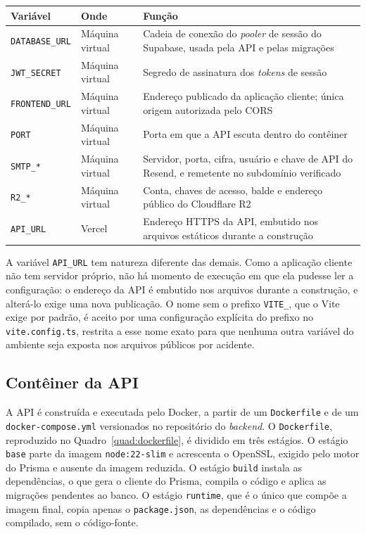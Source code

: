 \FloatBarrier
\begin{quadro}[h!]
\caption{Variáveis de ambiente de produção}
\label{quad:variaveisAmbiente}
\footnotesize
\begin{tabular}{|p{3.0cm}|p{2.2cm}|p{8.3cm}|}
\hline
\textbf{Variável} & \textbf{Onde} & \textbf{Função} \\ \hline
\texttt{DATABASE\_URL} & Máquina virtual & Cadeia de conexão do \textit{pooler} de sessão do Supabase, usada pela API e pelas migrações \\ \hline
\texttt{JWT\_SECRET} & Máquina virtual & Segredo de assinatura dos \textit{tokens} de sessão \\ \hline
\texttt{FRONTEND\_URL} & Máquina virtual & Endereço publicado da aplicação cliente; única origem autorizada pelo CORS \\ \hline
\texttt{PORT} & Máquina virtual & Porta em que a API escuta dentro do contêiner \\ \hline
\texttt{SMTP\_*} & Máquina virtual & Servidor, porta, cifra, usuário e chave de API do Resend, e remetente no subdomínio verificado \\ \hline
\texttt{R2\_*} & Máquina virtual & Conta, chaves de acesso, balde e endereço público do Cloudflare R2 \\ \hline
\texttt{API\_URL} & Vercel & Endereço HTTPS da API, embutido nos arquivos estáticos durante a construção \\ \hline
\end{tabular}
\end{quadro}
\FloatBarrier

A variável \texttt{API\_URL} tem natureza diferente das demais. Como a aplicação cliente não tem servidor próprio, não há momento de execução em que ela pudesse ler a configuração: o endereço da API é embutido nos arquivos durante a construção, e alterá-lo exige uma nova publicação. O nome sem o prefixo \texttt{VITE\_}, que o Vite exige por padrão, é aceito por uma configuração explícita do prefixo no \texttt{vite.config.ts}, restrita a esse nome exato para que nenhuma outra variável do ambiente seja exposta nos arquivos públicos por acidente.

\subsection{Contêiner da API}

A API é construída e executada pelo Docker, a partir de um \texttt{Dockerfile} e de um \texttt{docker-compose.yml} versionados no repositório do \textit{backend}. O \texttt{Dockerfile}, reproduzido no Quadro~\ref{quad:dockerfile}, é dividido em três estágios. O estágio \texttt{base} parte da imagem \texttt{node:22-slim} e acrescenta o OpenSSL, exigido pelo motor do Prisma e ausente da imagem reduzida. O estágio \texttt{build} instala as dependências, o que gera o cliente do Prisma, compila o código e aplica as migrações pendentes ao banco. O estágio \texttt{runtime}, que é o único que compõe a imagem final, copia apenas o \texttt{package.json}, as dependências e o código compilado, sem o código-fonte.

